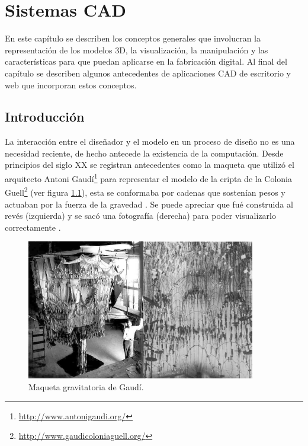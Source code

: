 \cleardoublepage
\chapter{{Sistemas CAD}}
\label{chap: cap2}
En este capítulo se describen los conceptos generales que involucran la representación de los modelos 3D, la visualización, la manipulación y las características para que puedan aplicarse en la fabricación digital. Al final del capítulo se describen algunos antecedentes de aplicaciones CAD de escritorio y web que incorporan estos conceptos.\newline

\section{Introducción}

La interacción entre el diseñador y el modelo en un proceso de diseño no es una necesidad reciente, de hecho antecede la existencia de la computación. 
Desde principios del siglo XX se registran antecedentes como la maqueta que utilizó el arquitecto Antoni Gaudí\footnote{\url{http://www.antonigaudi.org/}} para representar el modelo de la cripta de la Colonia Guell\footnote{\url{http://www.gaudicoloniaguell.org/}} (ver figura \ref{fig:gaudi}), esta se conformaba por  cadenas que sostenían pesos y actuaban por la fuerza de la gravedad \citep{Davis2013}. Se puede apreciar que fué  construida al revés (izquierda) y se sacó una fotografía (derecha) para poder visualizarlo correctamente \citep{AA.VV2002}.

\begin{figure}[ht]
\includegraphics[width=10cm]{Img/GEO/geo-gaudic.jpg}
\centering
\caption{\footnotesize{Maqueta gravitatoria de Gaudí.}}
\label{fig:gaudi}
\end{figure}


